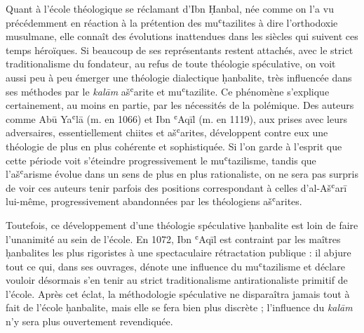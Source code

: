 Quant à l'école théologique se réclamant d'Ibn Ḥanbal, née comme on l'a
vu précédemment en réaction à la prétention des muʿtazilites à dire
l'orthodoxie musulmane, elle connaît des évolutions inattendues dans les
siècles qui suivent ces temps héroïques. Si beaucoup de ses
représentants restent attachés, avec le strict traditionalisme du
fondateur, au refus de toute théologie spéculative, on voit aussi peu à
peu émerger une théologie dialectique ḥanbalite, très influencée dans
ses méthodes par le \emph{kalām} ašʿarite et muʿtazilite. Ce phénomène
s'explique certainement, au moins en partie, par les nécessités de la
polémique. Des auteurs comme Abū Yaʿlā (m. en 1066) et Ibn ʿAqīl (m. en
1119), aux prises avec leurs adversaires, essentiellement chiites et
ašʿarites, développent contre eux une théologie de plus en plus
cohérente et sophistiquée. Si l'on garde à l'esprit que cette période
voit s'éteindre progressivement le muʿtazilisme, tandis que l'ašʿarisme
évolue dans un sens
de plus en plus rationaliste, on ne sera pas surpris de voir ces auteurs
tenir parfois des positions correspondant à celles d'al-Ašʿarī lui-même,
progressivement abandonnées par les théologiens ašʿarites.

Toutefois, ce développement d'une théologie spéculative ḥanbalite est
loin de faire l'unanimité au sein de l'école. En 1072, Ibn ʿAqīl est
contraint par les maîtres ḥanbalites les plus rigoristes à une
spectaculaire rétractation publique : il abjure tout ce qui, dans ses
ouvrages, dénote une influence du muʿtazilisme et déclare vouloir
désormais s'en tenir au strict traditionalisme antirationaliste primitif
de l'école. Après cet éclat, la méthodologie spéculative ne disparaîtra
jamais tout à fait de l'école ḥanbalite, mais elle se fera bien plus
discrète ; l'influence du \emph{kalām} n'y sera plus ouvertement
revendiquée.

